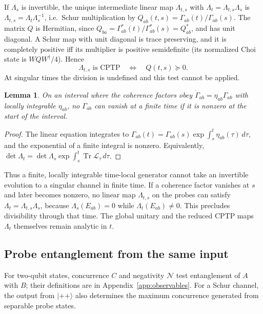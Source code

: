 \documentclass[11pt,a4paper]{article}
\newcommand{\ket}[1]{\lvert #1\rangle}
\newcommand{\Tr}{\operatorname{Tr}}
\newtheorem{lemma}[proposition]{Lemma}
\begin{document}
If $\Lambda_s$ is invertible, the unique intermediate linear map
$\Lambda_{t,s}$ with $\Lambda_t=\Lambda_{t,s}\Lambda_s$ is
$\Lambda_{t,s}=\Lambda_t\Lambda_s^{-1}$, i.e.\ Schur multiplication by
$Q_{ab}(t,s)=\Gamma_{ab}(t)/\Gamma_{ab}(s)$. The matrix $Q$ is Hermitian,
since $Q_{ba}=\Gamma_{ab}^*(t)/\Gamma_{ab}^*(s)=Q_{ab}^*$, and has unit
diagonal. A Schur map with unit diagonal is trace preserving, and it is
completely positive iff its multiplier is positive semidefinite (its
normalized Choi state is $WQW^\dagger/4$). Hence
\begin{equation}
 \Lambda_{t,s}\text{ is CPTP}\quad\Longleftrightarrow\quad
 Q(t,s)\succeq0.
 \label{eq:divisibility}
\end{equation}
At singular times the division is undefined and this test cannot be
applied.

\begin{lemma}\label{lem:nosingular}
On an interval where the coherence factors obey
$\dot\Gamma_{ab}=\eta_{ab}\Gamma_{ab}$ with locally integrable $\eta_{ab}$,
no $\Gamma_{ab}$ can vanish at a finite time if it is nonzero at the start
of the interval.
\end{lemma}
\begin{proof}
The linear equation integrates to
$\Gamma_{ab}(t)=\Gamma_{ab}(s)\exp\int_s^t\eta_{ab}(\tau)\,d\tau$, and the
exponential of a finite integral is nonzero. Equivalently,
$\det\Lambda_t=\det\Lambda_s\exp\int_s^t\Tr\mathcal L_\tau\,d\tau$.
\end{proof}
Thus a finite, locally integrable time-local generator cannot take an
invertible evolution to a singular channel in finite time. If a
coherence factor vanishes at $s$ and later becomes nonzero, no linear map
$\Lambda_{t,s}$ on the probes can satisfy $\Lambda_t=\Lambda_{t,s}\Lambda_s$,
because $\Lambda_s(E_{ab})=0$ while $\Lambda_t(E_{ab})\ne0$. This
precludes divisibility through that time. The global unitary and the
reduced CPTP maps $\Lambda_t$ themselves remain analytic in $t$.

\subsection{Probe entanglement from the same input}
\label{sec:entangling}

For two-qubit states, concurrence $C$ and negativity $\mathcal N$ test
entanglement of $A$ with $B$; their definitions are in
Appendix~\ref{app:observables}. For a Schur channel, the output from
$\ket{++}$ also determines the maximum concurrence generated from
separable probe states.
\end{document}
